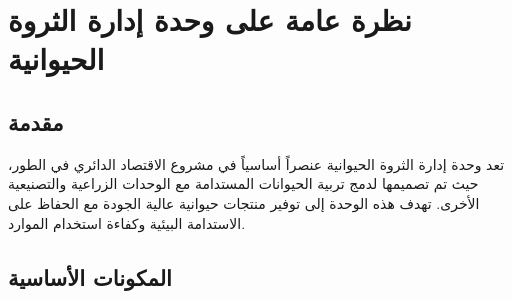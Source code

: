 \section{نظرة عامة على وحدة إدارة الثروة الحيوانية}

\subsection{مقدمة}
تعد وحدة إدارة الثروة الحيوانية عنصراً أساسياً في مشروع الاقتصاد الدائري في الطور، حيث تم تصميمها لدمج تربية الحيوانات المستدامة مع الوحدات الزراعية والتصنيعية الأخرى. تهدف هذه الوحدة إلى توفير منتجات حيوانية عالية الجودة مع الحفاظ على الاستدامة البيئية وكفاءة استخدام الموارد.

\subsection{المكونات الأساسية}
